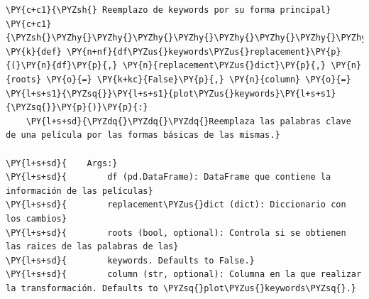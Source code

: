     \begin{tcolorbox}[breakable, size=fbox, boxrule=1pt, pad at break*=1mm,colback=cellbackground, colframe=cellborder]
\begin{Verbatim}[commandchars=\\\{\}]
\PY{c+c1}{\PYZsh{} Reemplazo de keywords por su forma principal}
\PY{c+c1}{\PYZsh{}\PYZhy{}\PYZhy{}\PYZhy{}\PYZhy{}\PYZhy{}\PYZhy{}\PYZhy{}\PYZhy{}\PYZhy{}\PYZhy{}\PYZhy{}\PYZhy{}\PYZhy{}\PYZhy{}\PYZhy{}\PYZhy{}\PYZhy{}\PYZhy{}\PYZhy{}\PYZhy{}\PYZhy{}\PYZhy{}\PYZhy{}\PYZhy{}\PYZhy{}\PYZhy{}\PYZhy{}\PYZhy{}\PYZhy{}\PYZhy{}\PYZhy{}\PYZhy{}\PYZhy{}\PYZhy{}\PYZhy{}\PYZhy{}\PYZhy{}\PYZhy{}\PYZhy{}\PYZhy{}\PYZhy{}\PYZhy{}\PYZhy{}\PYZhy{}\PYZhy{}\PYZhy{}}
\PY{k}{def} \PY{n+nf}{df\PYZus{}keywords\PYZus{}replacement}\PY{p}{(}\PY{n}{df}\PY{p}{,} \PY{n}{replacement\PYZus{}dict}\PY{p}{,} \PY{n}{roots} \PY{o}{=} \PY{k+kc}{False}\PY{p}{,} \PY{n}{column} \PY{o}{=} \PY{l+s+s1}{\PYZsq{}}\PY{l+s+s1}{plot\PYZus{}keywords}\PY{l+s+s1}{\PYZsq{}}\PY{p}{)}\PY{p}{:}
    \PY{l+s+sd}{\PYZdq{}\PYZdq{}\PYZdq{}Reemplaza las palabras clave de una película por las formas básicas de las mismas.}

\PY{l+s+sd}{    Args:}
\PY{l+s+sd}{        df (pd.DataFrame): DataFrame que contiene la información de las películas}
\PY{l+s+sd}{        replacement\PYZus{}dict (dict): Diccionario con los cambios}
\PY{l+s+sd}{        roots (bool, optional): Controla si se obtienen las raices de las palabras de las}
\PY{l+s+sd}{        keywords. Defaults to False.}
\PY{l+s+sd}{        column (str, optional): Columna en la que realizar la transformación. Defaults to \PYZsq{}plot\PYZus{}keywords\PYZsq{}.}


\end{Verbatim}
\end{tcolorbox}
